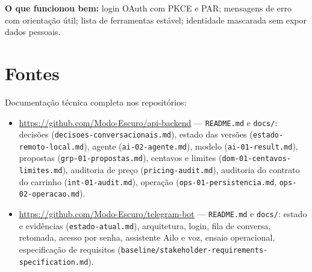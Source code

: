 \documentclass[11pt,a4paper]{article}
\newif\ifcenarioA
\begin{document}
\textbf{O que funcionou bem:} login OAuth com PKCE e PAR; mensagens de erro com orientação útil; lista de ferramentas estável; identidade mascarada sem expor dados pessoais.

\ifcenarioA
\section{Desafios e aprendizados}\label{anx:aprendizados}
\begin{itemize}
  \item \textbf{Dados alimentares:} o catálogo não informa alérgenos (ausência de dado, não erro do serviço); tratamos com bloqueio ``a verificar'' e a proposta de API.
  \item \textbf{Carrinho real:} sem formato de resposta nem chave contra duplicidade, a escrita exigiu confirmação de uso único e bloqueio de resultado desconhecido.
  \item \textbf{Erros nossos corrigidos:} limite de texto da IA que cortava respostas; regra que deixava ``a confirmar'' virar ``sem restrições''; ranking que bloqueava opções válidas; código antigo de carrinho que marcava escrita como concluída sem confirmação.
  \item \textbf{Aprendizado central:} a IA entende a conversa, mas a decisão precisa ficar em regras verificáveis; e um bom assistente precisa saber dizer ``não sei''.
\end{itemize}
\fi

\section{Fontes}\label{anx:fontes}
Documentação técnica completa nos repositórios:
\begin{itemize}
  \item \url{https://github.com/Modo-Escuro/api-backend} --- \texttt{README.md} e \texttt{docs/}: decisões (\nolinkurl{decisoes-conversacionais.md}), estado das versões (\nolinkurl{estado-remoto-local.md}), agente (\nolinkurl{ai-02-agente.md}), modelo (\nolinkurl{ai-01-result.md}), propostas (\nolinkurl{grp-01-propostas.md}), centavos e limites (\nolinkurl{dom-01-centavos-limites.md}), auditoria de preço (\nolinkurl{pricing-audit.md}), auditoria do contrato do carrinho (\nolinkurl{int-01-audit.md}), operação (\nolinkurl{ops-01-persistencia.md}, \nolinkurl{ops-02-operacao.md}).
  \item \url{https://github.com/Modo-Escuro/telegram-bot} --- \texttt{README.md} e \texttt{docs/}: estado e evidências (\nolinkurl{estado-atual.md}), arquitetura, login, fila de conversa, retomada, acesso por senha, assistente Ailo e voz, ensaio operacional, especificação de requisitos (\nolinkurl{baseline/stakeholder-requirements-specification.md}).
\end{itemize}
\end{document}
